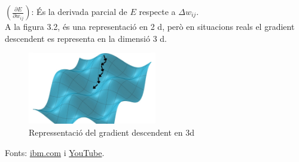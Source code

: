 $\left( \frac{\partial E}{\partial w_{ij}} \right)$: És la derivada parcial de $E$ respecte a $\Delta w_{ij}$. \\

A la figura 3.2, és una representació en 2 d, però en situacions reals el gradient descendent es representa en la dimensió 3 d.


\begin{figure}[H]
    \centering
    \includegraphics[width=0.5\textwidth]{./figures/gradient_descendent3d.png}
    \caption{Repressentació del gradient descendent en 3d}
\end{figure}

Fonts: \href{https://www.ibm.com/es-es/think/topics/gradient-descent}{ibm.com} i \href{https://www.youtube.com/watch?v=A6FiCDoz8_4&ab_channel=DotCSV}{YouTube}.

